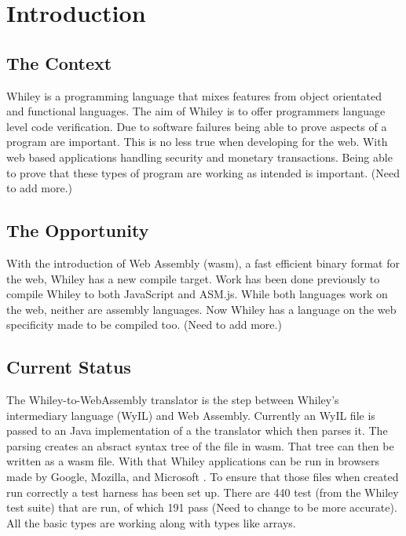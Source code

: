 \chapter{Introduction}\label{C:intro}

\section{The Context}
Whiley is a programming language that mixes features from object orientated and functional languages. The aim of Whiley is to offer programmers language level code verification. Due to software failures being able to prove aspects of a program are important. This is no less true when developing for the web. With web based applications handling security and monetary transactions. Being able to prove that these types of program are working as intended is important. (Need to add more.)

\section{The Opportunity}
With the introduction of Web Assembly (wasm), a fast efficient binary format for the web, Whiley has a new compile target. Work has been done previously to compile Whiley to both JavaScript and ASM.js. While both languages work on the web, neither are assembly languages. Now Whiley has a language on the web specificity made to be compiled too. (Need to add more.)

\section{Current Status}
The Whiley-to-WebAssembly translator is the step between Whiley's intermediary language (WyIL) and Web Assembly. Currently an WyIL file is passed to an Java implementation of a the translator which then parses it. The parsing creates an absract syntax tree of the file in wasm. That tree can then be written as a wasm file. With that Whiley applications can be run in browsers made by Google, Mozilla, and Microsoft \cite{8_wagner_2016}. To ensure that those files when created run correctly a test harness has been set up. There are 440 test (from the Whiley test suite) that are run, of which 191 pass (Need to change to be more accurate). All the basic types are working along with types like arrays.

